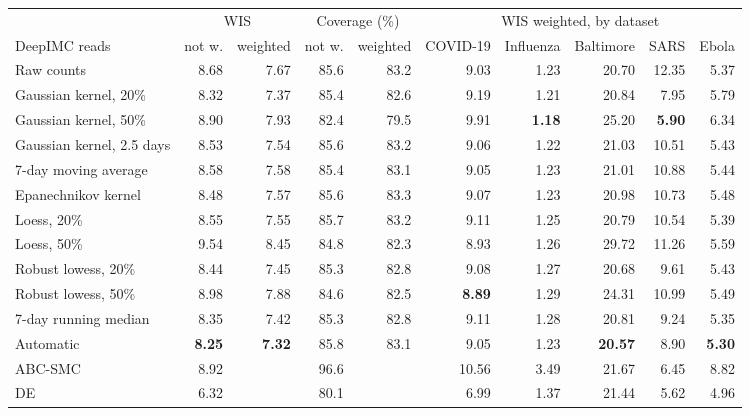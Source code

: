 \begin{tabular}{lrrrrrrrrr}
\toprule
 & \multicolumn{2}{c}{WIS} & \multicolumn{2}{c}{Coverage (\%)} & \multicolumn{5}{c}{WIS weighted, by dataset} \\
\cmidrule(lr){2-3}\cmidrule(lr){4-5}\cmidrule(lr){6-10}
DeepIMC reads & not w. & weighted & not w. & weighted & COVID-19 & Influenza & Baltimore & SARS & Ebola \\
\midrule
Raw counts & 8.68 & 7.67 & 85.6 & 83.2 & 9.03 & 1.23 & 20.70 & 12.35 & 5.37 \\
Gaussian kernel, 20\% & 8.32 & 7.37 & 85.4 & 82.6 & 9.19 & 1.21 & 20.84 & 7.95 & 5.79 \\
Gaussian kernel, 50\% & 8.90 & 7.93 & 82.4 & 79.5 & 9.91 & \textbf{1.18} & 25.20 & \textbf{5.90} & 6.34 \\
Gaussian kernel, 2.5 days & 8.53 & 7.54 & 85.6 & 83.2 & 9.06 & 1.22 & 21.03 & 10.51 & 5.43 \\
7-day moving average & 8.58 & 7.58 & 85.4 & 83.1 & 9.05 & 1.23 & 21.01 & 10.88 & 5.44 \\
Epanechnikov kernel & 8.48 & 7.57 & 85.6 & 83.3 & 9.07 & 1.23 & 20.98 & 10.73 & 5.48 \\
Loess, 20\% & 8.55 & 7.55 & 85.7 & 83.2 & 9.11 & 1.25 & 20.79 & 10.54 & 5.39 \\
Loess, 50\% & 9.54 & 8.45 & 84.8 & 82.3 & 8.93 & 1.26 & 29.72 & 11.26 & 5.59 \\
Robust lowess, 20\% & 8.44 & 7.45 & 85.3 & 82.8 & 9.08 & 1.27 & 20.68 & 9.61 & 5.43 \\
Robust lowess, 50\% & 8.98 & 7.88 & 84.6 & 82.5 & \textbf{8.89} & 1.29 & 24.31 & 10.99 & 5.49 \\
7-day running median & 8.35 & 7.42 & 85.3 & 82.8 & 9.11 & 1.28 & 20.81 & 9.24 & 5.35 \\
Automatic & \textbf{8.25} & \textbf{7.32} & 85.8 & 83.1 & 9.05 & 1.23 & \textbf{20.57} & 8.90 & \textbf{5.30} \\
\midrule
ABC-SMC & 8.92 &  & 96.6 &  & 10.56 & 3.49 & 21.67 & 6.45 & 8.82 \\
DE & 6.32 &  & 80.1 &  & 6.99 & 1.37 & 21.44 & 5.62 & 4.96 \\
\bottomrule
\end{tabular}
